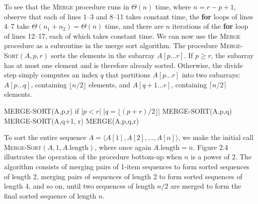 \documentclass{report}
\begin{document}
        \bigbreak \noindent 
        To see that the \textsc{Merge} procedure runs in $\Theta(n)$ time, where $n = r - p + 1$, 
        observe that each of lines 1--3 and 8--11 takes constant time, the \textbf{for} loops of 
        lines 4--7 take $\Theta(n_1 + n_2) = \Theta(n)$ time, and there are $n$ 
        iterations of the \textbf{for} loop of lines 12--17, each of which takes constant time.
        \bigbreak \noindent 
        We can now use the \textsc{Merge} procedure as a subroutine in the merge sort algorithm. 
        The procedure \textsc{Merge-Sort}$(A, p, r)$ sorts the elements in the subarray 
        $A[p \dots r]$. If $p \geq r$, the subarray has at most one element and is therefore 
        already sorted. Otherwise, the divide step simply computes an index $q$ that partitions 
        $A[p \dots r]$ into two subarrays: $A[p \dots q]$, containing $\lfloor n/2 \rfloor$ elements, 
        and $A[q + 1 \dots r]$, containing $\lceil n/2 \rceil$ elements.
        \bigbreak \noindent 
        \begin{cppcode}
        MERGE-SORT(A,p,r)
            if |$p < r$|
                |$q =  \lfloor (p+r)/2 \rfloor$|
                MERGE-SORT(A,p,q)
                MERGE-SORT(A,q+1, r)
                MERGE(A,p,q,r)
        \end{cppcode}
        \bigbreak \noindent 
        To sort the entire sequence $A = \langle A[1], A[2], \dots, A[n] \rangle$, we make the initial call 
        \textsc{Merge-Sort}$(A, 1, A.\text{length})$, where once again $A.\text{length} = n$. Figure 2.4 illustrates 
        the operation of the procedure bottom-up when $n$ is a power of 2. The algorithm consists of merging pairs of 
        1-item sequences to form sorted sequences of length 2, merging pairs of sequences of length 2 to form sorted 
        sequences of length 4, and so on, until two sequences of length $n / 2$ are merged to form the final sorted 
        sequence of length $n$.
        \bigbreak \noindent 

        \pagebreak 
\end{document}
